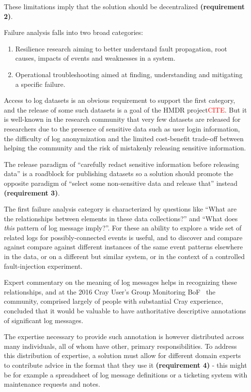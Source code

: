 These limitations imply that the solution should be decentralized 
\textbf{(requirement 2)}. 

Failure analysis falls into two broad categories:
\begin{enumerate}
\item Resilience research aiming to better understand fault propagation,
      root causes, impacts of events and weaknesses in a system. 
\item Operational troubleshooting aimed at finding, understanding and
      mitigating a specific failure.
\end{enumerate}

Access to log datasets is an obvious requirement to support
the first category, and the release of some such datasets is a goal 
of the HMDR project\textcolor{red}{CITE}. But it is well-known in the research 
community that very few datasets are released for researchers
due to the presence of sensitive data such as user login information, 
the difficulty of log anonymization and the limited cost-benefit 
trade-off between helping the community and the risk of mistakenly 
releasing sensitive information. 

The release paradigm of ``carefully redact sensitive information
before releasing data'' is a roadblock for publishing datasets so
a solution should promote the opposite paradigm of ``select some 
non-sensitive data and release that'' instead \textbf{(requirement 3)}.

The first failure analysis category is characterized by questions 
like ``What are the relationships between elements in these data 
collections?'' and ``What does \emph{this} pattern of log message imply?''.
For these an ability to explore a wide set of related logs for 
possibly-connected events is useful, and to discover and compare 
against compare against different instances of the same event 
patterns elsewhere in the data, or on a different but similar 
system, or in the context of a controlled fault-injection experiment. 

Expert commentary on the meaning of log messages helps in recognizing
these relationships, and at the 2016 Cray User's Group Monitoring 
BoF~\cite{CUG2016BoF} the community, comprised largely of people with 
substantial Cray experience, concluded that it would be valuable to 
have authoritative descriptive annotations of significant log messages.

The expertise necessary to provide such annotation is however distributed 
across many individuals, all of whom have other, primary responsibilities. 
To address this distribution of expertise, a solution must allow for 
different domain experts to contribute advice in the format that they
use it \textbf{(requirement 4)} - this might be for example a 
spreadsheet of log message definitions or a ticketing system with 
maintenance requests and notes.

